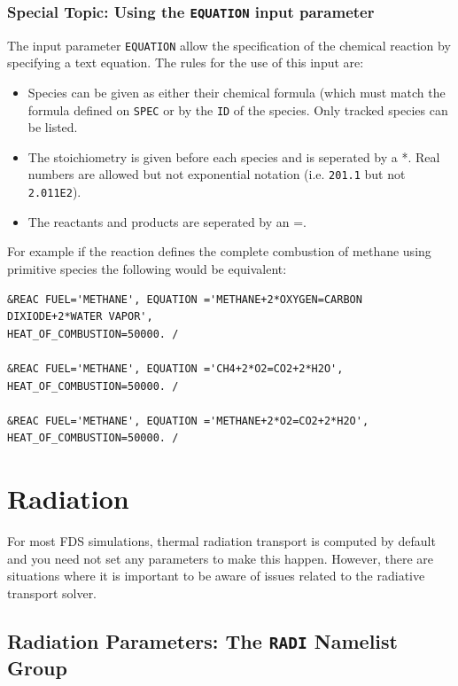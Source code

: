 \documentclass[11pt]{book}
\newcommand{\ct}{\tt\small}
\begin{document}
\subsection{Special Topic: Using the {\ct EQUATION} input parameter}
\label{info:EQUATION}

The input parameter {\ct EQUATION} allow the specification of the chemical reaction by specifying a text equation.  The rules for the use of this input are:

\begin{itemize}
\item Species can be given as either their chemical formula (which must match the formula defined on {\ct SPEC} or by the {\ct ID} of the species.  Only tracked species can be listed.
\item The stoichiometry is given before each species and is seperated by a *.  Real numbers are allowed but not exponential notation (i.e. {\ct 201.1} but not {\ct 2.011E2}).
\item The reactants and products are seperated by an =.
\end{itemize}

For example if the reaction defines the complete combustion of methane using primitive species the following would be equivalent: 

\footnotesize
\begin{verbatim}
&REAC FUEL='METHANE', EQUATION ='METHANE+2*OXYGEN=CARBON DIXIODE+2*WATER VAPOR',
HEAT_OF_COMBUSTION=50000. /

&REAC FUEL='METHANE', EQUATION ='CH4+2*O2=CO2+2*H2O',
HEAT_OF_COMBUSTION=50000. /

&REAC FUEL='METHANE', EQUATION ='METHANE+2*O2=CO2+2*H2O',
HEAT_OF_COMBUSTION=50000. /
\end{verbatim} \normalsize


\chapter{Radiation}

For most FDS simulations, thermal radiation transport is computed by default and you need not set any
parameters to make this happen. However, there are situations where it is important to be aware of
issues related to the radiative transport solver.

\section{Radiation Parameters: The \texorpdfstring{{\tt RADI}}{RADI} Namelist Group}
\label{info:RADI}
\end{document}
